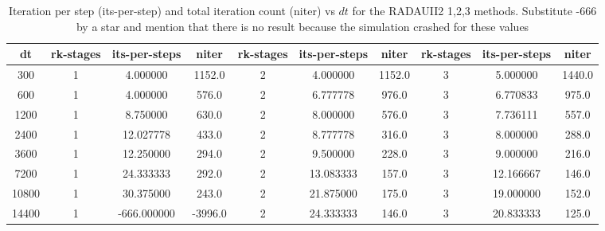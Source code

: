 \documentclass[a4paper, 12pt]{article}
\newcommand{\checkit}[1]{{\color{red}#1}}
\begin{document}
\begin{table}[h]\centering
\begin{scriptsize}
\begin{tabular}{c||c|c|c||c|c|c||c|c|c}
 dt & rk-stages  &  its-per-steps  &   niter  &  rk-stages  &  its-per-steps  &   niter  &  rk-stages  &  its-per-steps  &   niter\\ \hline
300  &        1 &      4.000000 & 1152.0 &         2 &      4.000000 & 1152.0 &         3&       5.000000 & 1440.0\\
600  &        1  &     4.000000 &  576.0 &         2  &     6.777778 &  976.0  &        3 &      6.770833 &  975.0\\
1200  &        1  &     8.750000&   630.0 &         2  &     8.000000 &  576.0  &        3 &      7.736111 &  557.0\\
2400   &       1   &   12.027778 &  433.0  &        2   &    8.777778 &  316.0   &       3  &     8.000000  & 288.0\\
3600    &      1    &  12.250000 &  294.0   &       2    &   9.500000 &  228.0    &      3   &    9.000000  & 216.0\\
7200     &     1   &   24.333333  & 292.0    &      2     & 13.083333 &  157.0     &     3    &  12.166667  & 146.0\\
10800     &     1   &   30.375000 &  243.0    &      2  &    21.875000 &  175.0     &     3    &  19.000000 &  152.0\\
14400      &    1   & -666.000000 & -3996.0    &      2 &     24.333333 &  146.0     &     3    &  20.833333 &  125.0
\end{tabular}
\caption{Iteration per step (its-per-step) and total iteration count (niter) vs $dt$ for the RADAUII2 1,2,3 methods.
\checkit{Substitute -666 by a star and mention that there is no result because the simulation crashed for these values}}
\label{tab1_niter_vs_dt}
\end{scriptsize}
\end{table}







\end{document}
